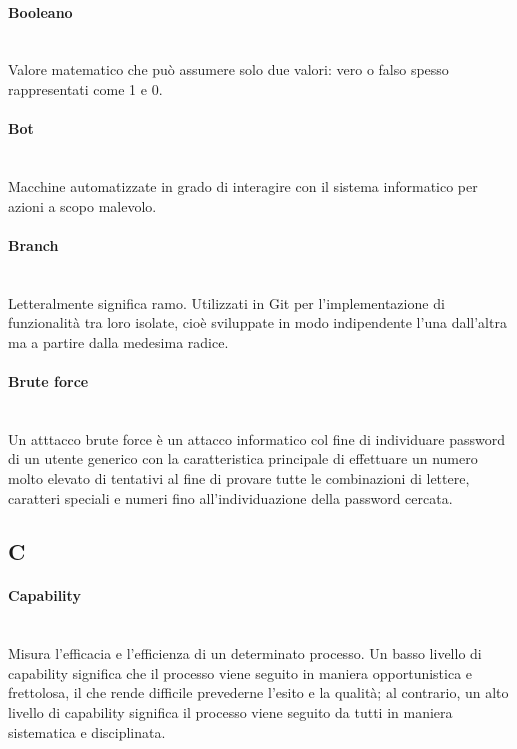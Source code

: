 \paragraph{Booleano}~\smallskip \\
Valore matematico che può assumere solo due valori: vero o falso spesso rappresentati come 1 e 0.

\paragraph{Bot}~\smallskip \\
Macchine automatizzate in grado di interagire con il sistema informatico per azioni a scopo malevolo.

\paragraph{Branch}~\smallskip \\
Letteralmente significa ramo. Utilizzati in Git per l'implementazione di funzionalità tra loro isolate, cioè sviluppate in modo indipendente l'una dall'altra ma a partire dalla medesima radice.

\paragraph{Brute force}~\smallskip \\
Un atttacco brute force è un attacco informatico col fine di individuare password di un utente generico con la caratteristica principale di effettuare un numero molto elevato di tentativi al fine di provare tutte le combinazioni di lettere, caratteri speciali e numeri fino all'individuazione della password cercata.
\newpage
{}
\subsection*{C}
\paragraph{Capability}~\smallskip \\
Misura l'efficacia e l'efficienza di un determinato processo. Un basso livello di capability significa che il processo viene seguito in maniera opportunistica e frettolosa, il che rende difficile prevederne l'esito e la qualità; al contrario, un alto livello di capability significa il processo viene seguito da tutti in maniera sistematica e disciplinata.


